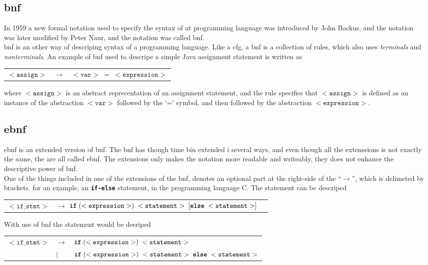 \subsection{\ac{bnf}}
In 1959 a new formal notation used to specify the syntax of at programming language was introduced by John Backus, and the notation was later modified by Peter Naur, and the notation was called \ac{bnf}. \\
\ac{bnf} is an other way of descriping syntax of a programming language. Like a \ac{cfg}, a \ac{bnf} is a collection of rules, which also uses \textit{terminals} and \textit{nonterminals}. An example of \ac{bnf} used to descripe a simple Java assignment statement is written as

\begin{tabular}{l l l}
$<\texttt{assign}>$ & $\rightarrow$ & $<\texttt{var}> \; = \; <\texttt{expression}>$ 
\end{tabular}

where $<\texttt{assign}>$ is an abstract reprecentation of an assignment statement, and the rule specifies that $<\texttt{assign}>$ is defined as an instance of the abstraction $<\texttt{var}>$ followed by the `=' symbol, and then followed by the abstraction $<\texttt{expression}>$.

\subsection{\ac{ebnf}}
\ac{ebnf} is an extended version of \ac{bnf}. The \ac{bnf} has though time bin extended i several ways, and even though all the extenssions is not exactly the same, the are all called \ac{ebnf}. The extensions only makes the notation more readable and writeably, they does not enhance the descriptive power of \ac{bnf}. \\
One of the things included in one of the extensions of the \ac{bnf}, denotes an optional part at the right-side of the ``$\rightarrow$'', which is delimeted by brackets. for an example, an \textbf{\texttt{if-else}} statement, in the programming language C. The statement can be descriped

\begin{tabular}{l l l}
$< \texttt{if\_stmt}>$ & $\rightarrow$ $ \textbf{\texttt{if}} \; ( < \texttt{expression} > ) \;  < \texttt{statement} > \; [ \textbf{\texttt{else}} \; < \texttt{statement} > ]$
\end{tabular}

With use of \ac{bnf} the statement would be desriped \\

\begin{tabular}{l l l}
$< \texttt{if\_stmt}>$ & $\rightarrow$ &  $\textbf{\texttt{if}}  \; ( < \texttt{expression} > ) \;  < \texttt{statement} >$ \\
 & $|$ & $ \textbf{\texttt{if}} \; ( < \texttt{expression} > ) \;  < \texttt{statement} > \; \textbf{\texttt{else}} \; < \texttt{statement} > $
\end{tabular}
